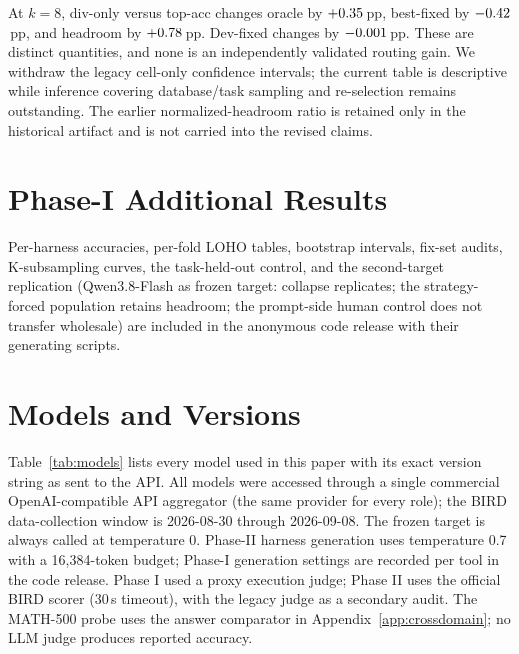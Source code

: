 At $k=8$, div-only versus top-acc changes oracle by
$+0.35$\,pp, best-fixed by $-0.42$\,pp,
and headroom by $+0.78$\,pp. Dev-fixed changes by
$-0.001$\,pp. These are distinct quantities, and none is an
independently validated routing gain. We withdraw the legacy cell-only
confidence intervals; the current table is descriptive while inference
covering database/task sampling and re-selection remains outstanding.
The earlier normalized-headroom ratio is retained only in the historical
artifact and is not carried into the revised claims.

\begin{table}[t]
\centering\small

\caption{Canonical descriptive W1 reanalysis. Every pool contains $k$
selected candidates plus the common bare. Means over 18 cells and 100
overlapping database splits; no confidence intervals. Dev-fixed is chosen
only on development data; Best uses held-out outcomes.}
\label{tab:selection}
\end{table}

\section{Phase-I Additional Results}\label{app:phase1-results}
Per-harness accuracies, per-fold LOHO tables, bootstrap intervals,
fix-set audits, K-subsampling curves, the task-held-out control, and the
second-target replication (Qwen3.8-Flash as frozen target: collapse
replicates; the strategy-forced population retains headroom; the
prompt-side human control does not transfer wholesale) are included in
the anonymous code release with their generating scripts.

\section{Models and Versions}\label{app:models}

Table~\ref{tab:models} lists every model used in this paper with its exact
version string as sent to the API. All models were accessed through a single
commercial OpenAI-compatible API aggregator (the same provider for every
role); the BIRD data-collection window is 2026-08-30 through 2026-09-08. The frozen
target is always called at temperature 0. Phase-II harness generation uses
temperature 0.7 with a 16{,}384-token budget; Phase-I generation settings are
recorded per tool in the code release. Phase I used a proxy execution judge;
Phase II uses the official BIRD scorer (30\,s timeout), with the legacy
judge as a secondary audit. The MATH-500 probe uses the answer comparator
in Appendix~\ref{app:crossdomain}; no LLM judge produces reported accuracy.


